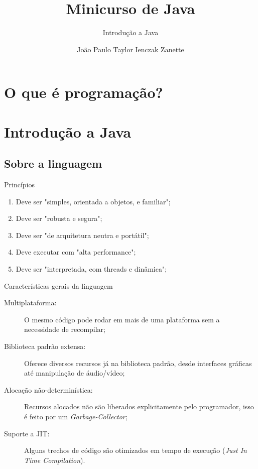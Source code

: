 \documentclass{beamer}
\title{Minicurso de Java}
\subtitle{Introdução a Java}
\author{João Paulo Taylor Ienczak Zanette}
\begin{document}
\maketitle

\section{O que é programação?}

\section{Introdução a Java}
\subsection{Sobre a linguagem}

\begin{frame}{Princípios}
    \begin{enumerate}
        \item Deve ser "simples, orientada a objetos, e familiar";
        \item Deve ser "robusta e segura";
        \item Deve ser "de arquitetura neutra e portátil";
        \item Deve executar com "alta performance";
        \item Deve ser "interpretada, com threads e dinâmica";
    \end{enumerate}
\end{frame}


\begin{frame}{Características gerais da linguagem}

    \begin{description}
        \item[Multiplataforma:] O mesmo código pode rodar em mais de uma plataforma
            sem a necessidade de recompilar;
        \item[Biblioteca padrão extensa:] Oferece diversos recursos já na
            biblioteca padrão, desde interfaces gráficas até manipulação de
            áudio/vídeo;
        \item[Alocação não-determinística:] Recursos alocados não são liberados
            explicitamente pelo programador, isso é feito por um
            \emph{Garbage-Collector};
        \item[Suporte a JIT:] Alguns trechos de código são otimizados em tempo de
            execução (\textit{Just In Time Compilation}).
    \end{description}


\end{frame}
\end{document}
